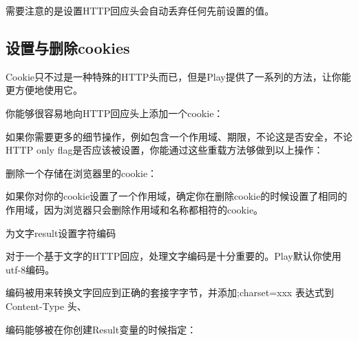 \documentclass[letterpaper,10pt,english]{sphinxmanual}
\begin{document}
需要注意的是设置HTTP回应头会自动丢弃任何先前设置的值。


\subsection{设置与删除cookies}
\label{\detokenize{index:cookies}}
Cookie只不过是一种特殊的HTTP头而已，但是Play提供了一系列的方法，让你能更方便地使用它。

你能够很容易地向HTTP回应头上添加一个cookie：

\begin{sphinxVerbatim}[commandchars=\\\{\}]
 
\end{sphinxVerbatim}

如果你需要更多的细节操作，例如包含一个作用域、期限，不论这是否安全，不论HTTP only flag是否应该被设置，你能通过这些重载方法够做到以上操作：

删除一个存储在浏览器里的cookie：

\begin{sphinxVerbatim}[commandchars=\\\{\}]
\end{sphinxVerbatim}

如果你对你的cookie设置了一个作用域，确定你在删除cookie的时候设置了相同的作用域，因为浏览器只会删除作用域和名称都相符的cookie。

为文字result设置字符编码

对于一个基于文字的HTTP回应，处理文字编码是十分重要的。Play默认你使用utf-8编码。

编码被用来转换文字回应到正确的套接字字节，并添加;charset=xxx 表达式到Content-Type 头、

编码能够被在你创建Result变量的时候指定：

\begin{sphinxVerbatim}[commandchars=\\\{\}]
   
      
\end{sphinxVerbatim}
\end{document}
